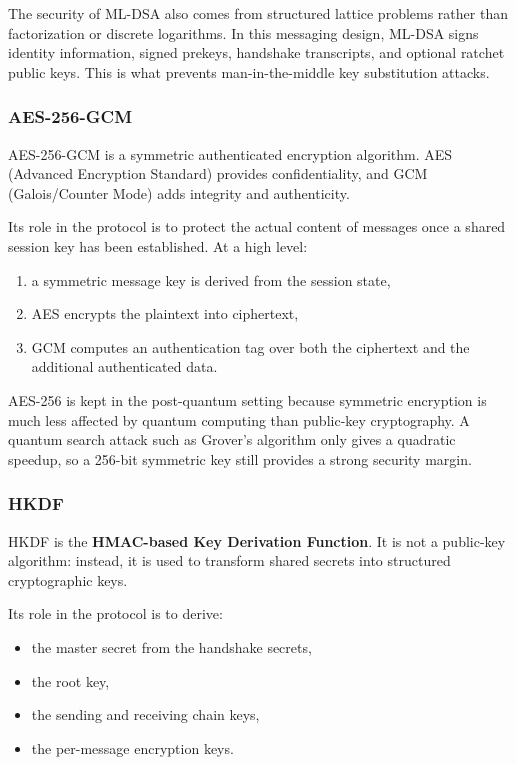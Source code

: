 \documentclass{article}
\begin{document}
      The security of ML-DSA also comes from structured lattice problems rather
      than factorization or discrete logarithms. In this messaging design, ML-DSA
      signs identity information, signed prekeys, handshake transcripts, and
      optional ratchet public keys. This is what prevents man-in-the-middle key
      substitution attacks.

      \subsubsection{AES-256-GCM}
      AES-256-GCM is a symmetric authenticated encryption algorithm. AES
      (Advanced Encryption Standard) provides confidentiality, and GCM
      (Galois/Counter Mode) adds integrity and authenticity.

      Its role in the protocol is to protect the actual content of messages once
      a shared session key has been established. At a high level:
      \begin{enumerate}
            \item a symmetric message key is derived from the session state,
            \item AES encrypts the plaintext into ciphertext,
            \item GCM computes an authentication tag over both the ciphertext and
                  the additional authenticated data.
      \end{enumerate}

      AES-256 is kept in the post-quantum setting because symmetric encryption is
      much less affected by quantum computing than public-key cryptography. A
      quantum search attack such as Grover's algorithm only gives a quadratic
      speedup, so a 256-bit symmetric key still provides a strong security
      margin.

      \subsubsection{HKDF}
      HKDF is the \textbf{HMAC-based Key Derivation Function}. It is not a
      public-key algorithm: instead, it is used to transform shared secrets into
      structured cryptographic keys.

      Its role in the protocol is to derive:
      \begin{itemize}
            \item the master secret from the handshake secrets,
            \item the root key,
            \item the sending and receiving chain keys,
            \item the per-message encryption keys.
      \end{itemize}
\end{document}
